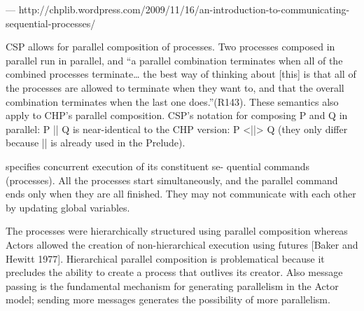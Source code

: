 ---
http://chplib.wordpress.com/2009/11/16/an-introduction-to-communicating-sequential-processes/

CSP allows for parallel composition of processes. Two processes composed in 
parallel run in parallel, and “a parallel combination terminates when all of 
the combined processes terminate… the best way of thinking about [this] is that 
all of the processes are allowed to terminate when they want to, and that the 
overall combination terminates when the last one does.”(R143). These semantics 
also apply to CHP’s parallel composition. CSP’s notation for composing P and Q 
in parallel: P || Q is near-identical to the CHP version: P <||> Q (they only 
differ because || is already used in the Prelude).


specifies concurrent execution of its constituent se-
quential commands (processes). All the processes start
simultaneously, and the parallel command ends only
when they are all finished. They may not communicate
with each other by updating global variables.


The processes were hierarchically structured using parallel composition whereas 
Actors allowed the creation of non-hierarchical execution using futures [Baker 
and Hewitt 1977]. Hierarchical parallel composition is problematical because it 
precludes the ability to create a process that outlives its creator.  Also 
message passing is the fundamental mechanism for generating parallelism in the 
Actor model; sending more messages generates the possibility of more 
parallelism.
